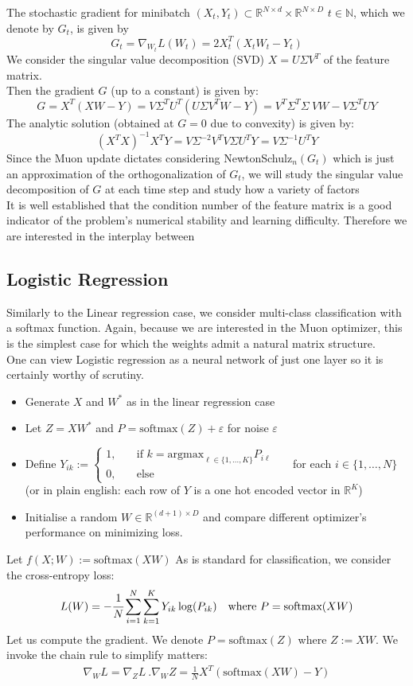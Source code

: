 \documentclass[12pt]{book}
\newcommand{\N}{\mathbb{N}}
\newcommand{\R}{\mathbb{R}}
\begin{document}
The stochastic gradient for minibatch $(X_t, Y_t)\subset \R^{N\times d} \times \R^{N\times D}$ $t\in\N$, which we denote by $G_t$, is given by 
\[
	G_t = \nabla_{W_t} L(W_t) = 2X_t^{T} (X_tW_t - Y_t)
\]
We consider the singular value decomposition (SVD) $X = U \Sigma V^{T}$ of the feature matrix. 
\\
Then the gradient $G$ (up to a constant) is given by:
 \[
G = X^{T}(XW - Y) = V\Sigma ^{T} U^{T}(U\Sigma V^{T} W - Y) = V^{T}\Sigma^{T}\Sigma \ VW - V\Sigma^{T} U Y
\]
The analytic solution (obtained at $G = 0$ due to convexity) is given by:
\[
	(X^{T}X)^{-1}X^{T}Y = V \Sigma^{-2}V^{T} V \Sigma U^{T}Y = V \Sigma ^{-1} U^{T}Y 
\] 
Since the Muon update dictates considering NewtonSchulz$_n(G_t)$ which is just an approximation of the orthogonalization of $G_t$, we will study the singular value decomposition of $G$ at each time step and study how a variety of factors 
\\
It is well established that the condition number of the feature matrix is a good indicator of the problem's numerical stability and learning difficulty. Therefore we are interested in the interplay between 
\subsection{Logistic Regression}
Similarly to the Linear regression case, we consider multi-class classification with a softmax function. Again, because we are interested in the Muon optimizer, this is the simplest case for which the weights admit a natural matrix structure. 
\\
One can view Logistic regression as a neural network of just one layer so it is certainly worthy of scrutiny.  
\begin{itemize}
\item Generate $X$ and  $W^*$ as in the linear regression case
\item  Let $Z = XW^*$ and  $P = \text{softmax}(Z) + \varepsilon $ for noise $\varepsilon $
\item  Define $Y_{ik} := \begin{cases}
		1, \quad &\text{if $k = \text{argmax}_{\ell \in \{1,\ldots,K\} } P_{i\ell} $}\\
		0, &\text{else}
\end{cases}$\ \ \  for each $i \in\{1,\ldots,N\} $ (or in plain english: each row of $Y$ is a one hot encoded vector in $\R^{K}$)
\item Initialise a random $W\in \R^{(d+1) \times D}$ and compare different optimizer's performance on minimizing loss. 
\end{itemize}
Let $f(X ; W) := \text{softmax}(XW)$
As is standard for classification, we consider the cross-entropy loss:
\[
L(W) = - \cfrac{1}{N} \sum_{i = 1}^{N} \sum_{k=1}^{K} {Y_{ik} \log(P_{ik})} \quad \text{where } P = \text{softmax}(XW)
\]
Let us compute the gradient. We denote $P = \text{softmax}(Z)$  where $Z := XW$. We invoke the chain rule to simplify matters: 
\begin{align*}
\nabla_W L = \nabla_Z L\  . \nabla_W Z = \frac{1}{N} X^{T} (\text{softmax}(XW) - Y)
\end{align*}
\end{document}
